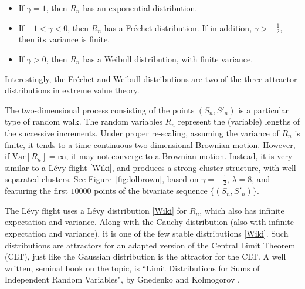 \documentclass[oneside,10pt]{book}
\begin{document}
\begin{itemize}
\item If $\gamma=1$, then $R_n$ has an exponential distribution.
\item If $-1<\gamma<0$, then $R_n$ has a \textcolor{index}{Fréchet distribution}. If in addition, $\gamma>-\frac{1}{2}$, then its variance is finite.
\item If $\gamma>0$, then $R_n$ has a \textcolor{index}{Weibull distribution}, with finite variance.
\end{itemize}
Interestingly, the Fréchet and Weibull distributions are two of the three
\textcolor{index}{attractor distributions} in \textcolor{index}{extreme value theory}.

The two-dimensional process consisting of the points $(S_n,S'_n)$ is a particular type of random walk. The random variables $R_n$ represent the (variable) lengths of the successive increments. Under proper re-scaling, assuming the variance of $R_n$ is finite, it tends to a time-continuous
two-dimensional Brownian motion. However, if $\mbox{Var}[R_n]=\infty$, it may not converge to a Brownian motion. Instead, it is very similar to a
\textcolor{index}{Lévy flight} [\href{https://en.wikipedia.org/wiki/L\%C3\%A9vy_flight}{Wiki}], and produces a strong cluster structure, with well separated clusters. See Figure~\ref{fig:lolbrown}, based on $\gamma=-\frac{1}{2}$, $\lambda=8$, and featuring the first $\num{10000}$ points
 of the bivariate sequence $\{(S_n,S'_n)\}$.

The
Lévy flight uses a \textcolor{index}{Lévy distribution}
[\href{https://bit.ly/3rV7mrq}{Wiki}] for $R_n$, which also has infinite expectation and variance. Along with
the \textcolor{index}{Cauchy distribution} (also with infinite expectation and variance), it is one of the few \textcolor{index}{stable distributions} [\href{https://en.wikipedia.org/wiki/Stable_distribution}{Wiki}]. Such distributions are attractors
for an adapted version of the \textcolor{index}{Central Limit Theorem} (CLT), just like the Gaussian distribution is the attractor
for the CLT. A well written, seminal book on the topic, is ``Limit Distributions for Sums of Independent Random Variables", by Gnedenko and Kolmogorov \cite{gk1954}.
\end{document}
